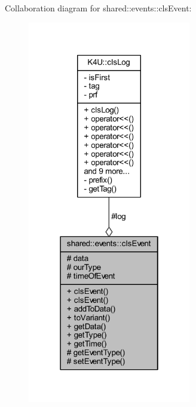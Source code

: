 Collaboration diagram for shared\-:\-:events\-:\-:cls\-Event\-:\nopagebreak
\begin{figure}[H]
\begin{center}
\leavevmode
\includegraphics[width=202pt]{de/df0/classshared_1_1events_1_1cls_event__coll__graph}
\end{center}
\end{figure}

